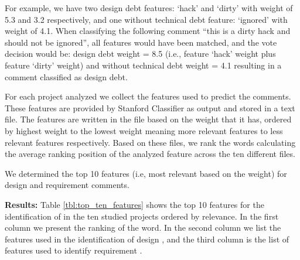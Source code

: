 For example, we have two design debt features: `hack' and `dirty' with weight of 5.3 and 3.2 respectively, and one without technical debt feature: `ignored' with weight of 4.1. When classifying the following comment ``this is a dirty hack and should not be ignored'', all features would have been matched, and the vote decision would be: design debt weight = 8.5 (i.e., feature `hack' weight plus feature `dirty' weight) and without technical debt weight = 4.1 resulting in a comment classified as design debt.

For each project analyzed we collect the features used to predict the \SATD comments. These features are provided by Stanford Classifier as output and stored in a text file. The features are written in the file based on the weight that it has, ordered by highest weight to the lowest weight meaning more relevant features to less relevant features respectively. Based on these files, we rank the words calculating the average ranking position of the analyzed feature across the ten different files. 

We determined the top 10 features (i.e, most relevant based on the weight) for design and requirement \SATD comments.

\vspace{1mm}
\noindent \textbf{Results:} Table \ref{tbl:top_ten_features} shows the top 10 features for the identification of \SATD in the ten studied projects ordered by relevance. In the first column we present the ranking of the word. In the second column we list the features used in the identification of design \SATD, and the third column is the list of features used to identify requirement \SATD.

